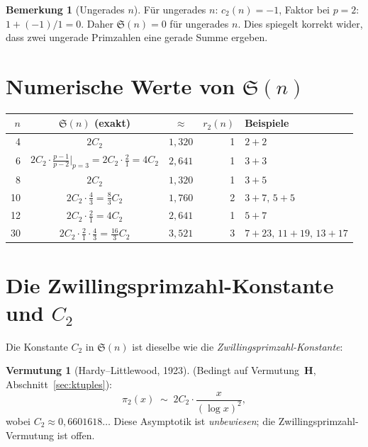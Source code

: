 \documentclass[12pt,a4paper]{amsart}
\theoremstyle{definition}
\newtheorem{bemerkung}[theorem]{Bemerkung}
\newtheorem{vermutung}[theorem]{Vermutung}
\begin{document}
\begin{bemerkung}[Ungerades $n$]
  Für ungerades $n$: $c_2(n) = -1$, Faktor bei $p=2$: $1+(-1)/1 = 0$.
  Daher $\mathfrak{S}(n) = 0$ für ungerades $n$.  Dies spiegelt korrekt wider,
  dass zwei ungerade Primzahlen eine gerade Summe ergeben.
\end{bemerkung}

\section{Numerische Werte von \texorpdfstring{$\mathfrak{S}(n)$}{S(n)}}
\label{sec:numerik}

\begin{center}
\begin{tabular}{rccrl}
\toprule
$n$ & $\mathfrak{S}(n)$ (exakt) & $\approx$ & $r_2(n)$ & Beispiele \\
\midrule
4  & $2C_2$ & $1{,}320$ & 1 & $2+2$ \\
6  & $2C_2 \cdot \frac{p-1}{p-2}\big|_{p=3} = 2C_2 \cdot \frac{2}{1} = 4C_2$ & $2{,}641$ & 1 & $3+3$ \\
8  & $2C_2$ & $1{,}320$ & 1 & $3+5$ \\
10 & $2C_2 \cdot \frac{4}{3} = \frac{8}{3}C_2$ & $1{,}760$ & 2 & $3+7,\, 5+5$ \\
12 & $2C_2 \cdot \frac{2}{1} = 4C_2$ & $2{,}641$ & 1 & $5+7$ \\
30 & $2C_2 \cdot \frac{2}{1}\cdot\frac{4}{3} = \frac{16}{3}C_2$
   & $3{,}521$ & 3 & $7+23,\, 11+19,\, 13+17$ \\
\bottomrule
\end{tabular}
\end{center}

\section{Die Zwillingsprimzahl-Konstante und \texorpdfstring{$C_2$}{C2}}
\label{sec:zwillingsprim}

Die Konstante $C_2$ in $\mathfrak{S}(n)$ ist dieselbe wie die
\emph{Zwillingsprimzahl-Konstante}:

\begin{vermutung}[Hardy--Littlewood, 1923]\label{conj:zp}
  (Bedingt auf Vermutung~$\mathbf{H}$, Abschnitt~\ref{sec:ktuples}):
  \[
    \pi_2(x) \;\sim\; 2 C_2 \cdot \frac{x}{(\log x)^2},
  \]
  wobei $C_2 \approx 0{,}6601618\ldots$
  Diese Asymptotik ist \emph{unbewiesen}; die Zwillingsprimzahl-Vermutung ist offen.
\end{vermutung}
\end{document}
